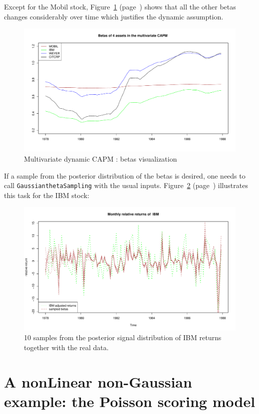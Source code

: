 \documentclass{article}
\begin{document}
Except for the Mobil stock, Figure~\ref{fig:betas} (page~\pageref{fig:betas}) shows that all the other betas changes considerably over time which justifies the dynamic assumption.
\begin{figure}[htbp]
  \centering
\includegraphics{vignette-032}

\caption{Multivariate dynamic CAPM : betas visualization}
\label{fig:betas}
\end{figure}

If a sample from the posterior distribution of the betas is desired, one needs to call
\texttt{GaussianthetaSampling} with the usual inputs. Figure~\ref{fig:sampleIBM}
(page~\pageref{fig:sampleIBM}) illustrates this task for the IBM stock:
\begin{figure}[htbp]
  \centering
\includegraphics{vignette-033}
\caption{10 samples from the posterior signal distribution of IBM returns together with the real data.}
\label{fig:sampleIBM}
\end{figure}

\section{A nonLinear non-Gaussian example: the Poisson scoring model}
\label{sec:nLnGaussian}
\end{document}
